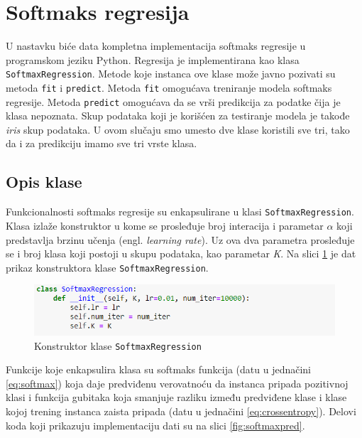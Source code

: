 \documentclass[a4paper,12pt]{report}
\begin{document}
\section{Softmaks regresija}

U nastavku biće data kompletna implementacija softmaks regresije u programskom jeziku Python. Regresija je implementirana kao klasa \texttt{SoftmaxRegression}. Metode koje instanca ove klase može javno pozivati su metoda \texttt{fit} i \texttt{predict}. Metoda \texttt{fit} omogućava treniranje modela softmaks regresije. Metoda \texttt{predict} omogućava da se vrši predikcija za podatke čija je klasa nepoznata. Skup podataka koji je korišćen za testiranje modela je takođe \textit{iris} skup podataka. U ovom slučaju smo umesto dve klase koristili sve tri, tako da i za predikciju imamo sve tri vrste klasa.

\subsection{Opis klase}

Funkcionalnosti softmaks regresije su enkapsulirane u klasi \texttt{SoftmaxRegression}. Klasa izlaže konstruktor u kome se prosleđuje broj interacija i parametar $\alpha$ koji predstavlja brzinu učenja (engl. \textit{learning rate}). Uz ova dva parametra prosleđuje se i broj klasa koji postoji u skupu podataka, kao parametar \textit{K}. Na slici \ref{fig:softmaxconst} je dat prikaz konstruktora klase \texttt{SoftmaxRegression}.

\begin{figure}[h]
    \centering
    \includegraphics[width=\textwidth]{softmax_constructor.png}
    \caption{Konstruktor klase \texttt{SoftmaxRegression}}\label{fig:softmaxconst}
\end{figure}

Funkcije koje enkapsulira klasa su softmaks funkcija (datu u jednačini \ref{eq:softmax}) koja daje predviđenu verovatnoću da instanca pripada pozitivnoj klasi i funkcija gubitaka koja smanjuje razliku između predviđene klase i klase kojoj trening instanca zaista pripada (datu u jednačini \ref{eq:crossentropy}). Delovi koda koji prikazuju implementaciju dati su na slici \ref{fig:softmaxpred}.
\end{document}
